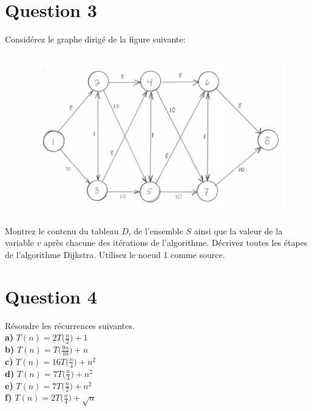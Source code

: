 \documentclass[12pt]{article}
\begin{document}
\newpage

\section*{Question 3}
Considérez le graphe dirigé de la figure suivante:

\begin{figure}[H]
	\centering
	\includegraphics[width=12cm]{q3} 
\end{figure}

Montrez le contenu du tableau \(D\), de l’ensemble \(S\) ainsi que la valeur de la variable \(v\) après chacune des itérations de l’algorithme. Décrivez toutes les étapes de l’algorithme Dijkstra. Utilisez le noeud 1 comme source.

\newpage

\section*{Question 4}
Résoudre les récurrences suivantes. \\

\textbf{a) } \(T(n)=2T\big(\frac{n}{2}\big)+1\) \\

\textbf{b) } \(T(n)=T\big(\frac{9n}{10}\big)+n\) \\

\textbf{c) } \(T(n)=16T\big(\frac{n}{4}\big)+n^2\) \\

\textbf{d) } \(T(n)=7T\big(\frac{n}{3}\big)+n^2\) \\

\textbf{e) } \(T(n)=7T\big(\frac{n}{2}\big)+n^2\) \\

\textbf{f) } \(T(n)=2T\big(\frac{n}{4}\big)+\sqrt{n}\) \\
\end{document}
